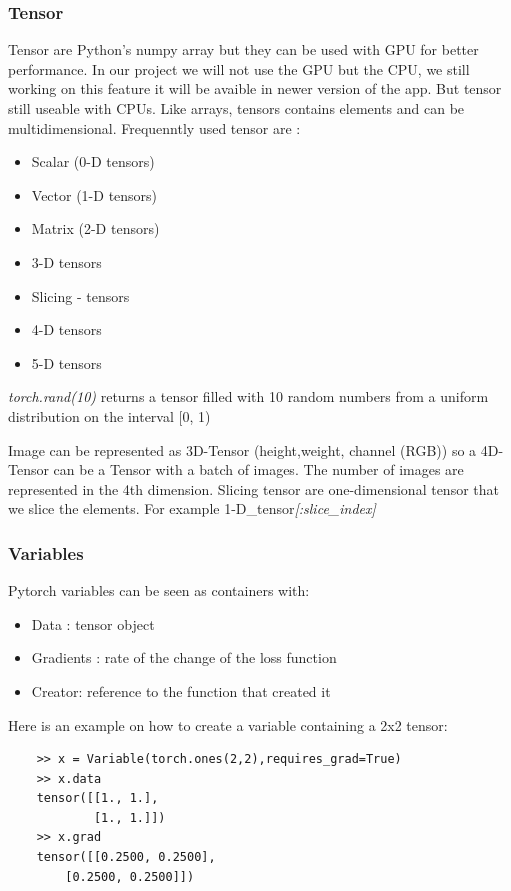 \subsubsection{Tensor}
Tensor are Python's numpy array but they can be used with GPU for better performance. In our project we will not use the GPU but the CPU, we still working on this feature it will be avaible in newer version of the app. But tensor still useable with CPUs. 
\newline Like arrays, tensors contains elements and can be multidimensional. Frequenntly used tensor are :
\begin{itemize}
    \item Scalar (0-D tensors)
    \item Vector (1-D tensors)
    \item Matrix (2-D tensors)
    \item 3-D tensors
    \item Slicing - tensors
    \item 4-D tensors
    \item 5-D tensors
\end{itemize}

\noindent \emph{torch.rand(10)} returns a tensor filled with 10 random numbers from a uniform distribution on the interval [0, 1)

Image can be represented as 3D-Tensor (height,weight, channel (RGB)) so a 4D-Tensor can be a Tensor with a batch of images. The number of images are represented in the 4th dimension. Slicing tensor are one-dimensional tensor that we slice the elements. For example 1-D\_tensor\textit{[:slice\_index]}   


\subsubsection{Variables}
Pytorch variables can be seen as containers with:
\begin{itemize}
    \item Data : tensor object
    \item Gradients : rate of the change of the loss function
    \item Creator: reference to the function that created it
\end{itemize}

Here is an example on how to create a variable containing a 2x2 tensor:
\begin{lstlisting}
    >> x = Variable(torch.ones(2,2),requires_grad=True)
    >> x.data
    tensor([[1., 1.],
            [1., 1.]])
    >> x.grad
    tensor([[0.2500, 0.2500],
        [0.2500, 0.2500]])
\end{lstlisting}

